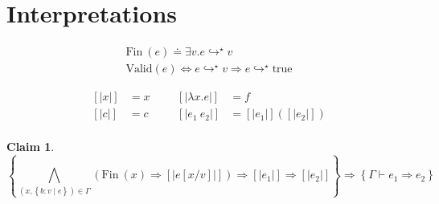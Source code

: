 \documentclass[10pt,a4paper]{article}
\newtheorem{claim}{Claim}
\newcommand\efun[2]{\ensuremath{\lambda #1 . #2}}
\newcommand\eapp[2]{\ensuremath{#1 \ #2}}
\newcommand\etrue{\ensuremath{\text{true}}}
\newcommand\tref[3]{\ensuremath{\left\lbrace {#1} \colon {#2} \mid {#3} \right\rbrace}}
\newcommand\fin[1]{\ensuremath{\text{Fin}\ (#1)}}
\newcommand\valid[1]{\ensuremath{\text{Valid}(#1)}}
\newcommand\sub[2]{\ensuremath{\left[ #2 / #1 \right]}}
\newcommand\interp[1]{\ensuremath{[|#1|]}}
\newcommand\evals[2]{\ensuremath{#1 \hookrightarrow^\star #2}}
\newcommand\issubref[3]{\ensuremath{#1 \vdash #2 \Rightarrow #3}}
\begin{document}
\section*{Interpretations}
\begin{align*}
\fin{e} \doteq \exists v. \evals{e}{v}\\
\valid{e} \Leftrightarrow \evals{e}{v}\Rightarrow\evals{e}{\etrue}
\end{align*}

\begin{align*}
\interp{x}&=x &&&
\interp{\efun{x}{e}}&=f\\
\interp{c}&=c &&&
\interp{\eapp{e_1}{e_2}}&=\interp{e_1}(\interp{e_2})\\
\end{align*}



\begin{claim}
$$
\left\lbrace	
	\bigwedge_{(x,\tref{b}{v}{e})\in\Gamma}(\fin{x}\Rightarrow \interp{e\sub{v}{x}})
	\Rightarrow \interp{e_1}
	\Rightarrow \interp{e_2}
\right\rbrace
\Rightarrow
\left\lbrace	
\issubref{\Gamma}{e_1}{e_2}
\right\rbrace
$$
\end{claim}
\end{document}
